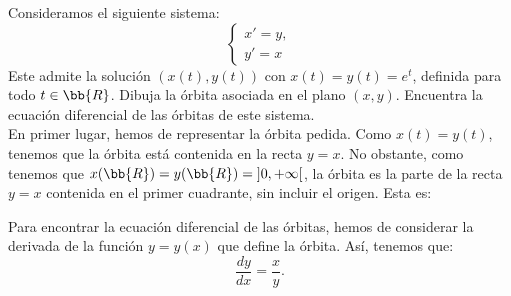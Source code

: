 \documentclass[12pt]{article}
\begin{document}
    \begin{ejercicio}
        Consideramos el siguiente sistema:
        \begin{equation*}
            \begin{cases}
                x' = y,\\
                y' = x
            \end{cases}
        \end{equation*}
        Este admite la solución $(x(t), y(t))$ con $x(t) = y(t) = e^t$, definida para todo $t \in \bb{R}$. Dibuja la órbita asociada en el plano $(x, y)$. Encuentra la ecuación diferencial de las órbitas de este sistema.\\

        En primer lugar, hemos de representar la órbita pedida. Como $x(t) = y(t)$, tenemos que la órbita está contenida en la recta $y = x$.
        No obstante, como tenemos que $x(\bb{R})=y(\bb{R}) = \left]0, +\infty\right[$, la órbita es la parte de la recta $y = x$ contenida en el primer cuadrante, sin incluir el origen. Esta es:
        \begin{figure}[H]
            \centering
        \end{figure}

        Para encontrar la ecuación diferencial de las órbitas, hemos de considerar la derivada de la función $y = y(x)$ que define la órbita. Así, tenemos que:
        \begin{equation*}
            \frac{dy}{dx} = \frac{x}{y}.
        \end{equation*}
    \end{ejercicio}
\end{document}
